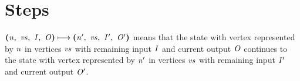 \documentclass[12pt]{article}
\begin{document}
\section{Steps}

$\steps{
  \cfg{\nterm{n}}{\nterm{vs}}{\nterm{I}}{\nterm{O}}
}{
  \cfg{\nterm{n'}}{\nterm{vs}}{\nterm{I'}}{\nterm{O'}}
}$ means that the state with vertex represented by $\nterm{n}$ in vertices
$\nterm{vs}$ with remaining input $\nterm{I}$ and current output $\nterm{O}$
continues to the state with vertex represented by $\nterm{n'}$ in vertices
$\nterm{vs}$ with remaining input $\nterm{I'}$ and current output $\nterm{O'}$.

\begin{mathpar}





\end{mathpar}
\end{document}
